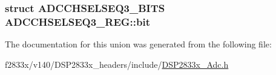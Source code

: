 \subsubsection[{bit}]{\setlength{\rightskip}{0pt plus 5cm}struct {\bf A\+D\+C\+C\+H\+S\+E\+L\+S\+E\+Q3\+\_\+\+B\+I\+T\+S} A\+D\+C\+C\+H\+S\+E\+L\+S\+E\+Q3\+\_\+\+R\+E\+G\+::bit}\label{union_a_d_c_c_h_s_e_l_s_e_q3___r_e_g_a888a92221932e871c156a32437761e12}


The documentation for this union was generated from the following file\+:\begin{DoxyCompactItemize}
\item 
f2833x/v140/\+D\+S\+P2833x\+\_\+headers/include/\hyperlink{_d_s_p2833x___adc_8h}{D\+S\+P2833x\+\_\+\+Adc.\+h}\end{DoxyCompactItemize}
